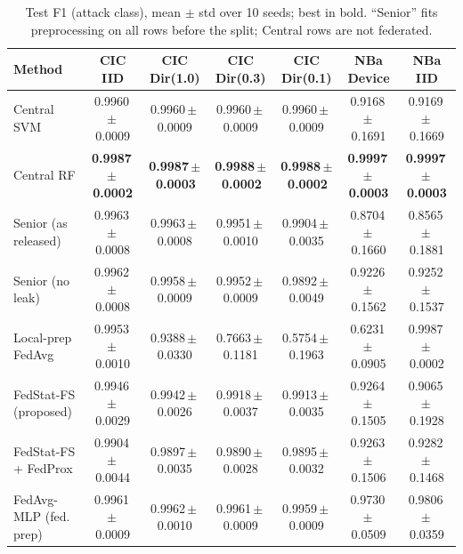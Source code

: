 \begin{table}[t]
\centering
\caption{Test F1 (attack class), mean $\pm$ std over 10 seeds; best in bold. ``Senior'' fits preprocessing on all rows before the split; Central rows are not federated.}
\label{tab:main}
\tiny
\setlength{\tabcolsep}{2.4pt}
\begin{tabular}{lcccccc}
\toprule
Method & CIC IID & CIC Dir(1.0) & CIC Dir(0.3) & CIC Dir(0.1) & NBa Device & NBa IID \\
\midrule
Central SVM & 0.9960\,$\pm$\,0.0009 & 0.9960\,$\pm$\,0.0009 & 0.9960\,$\pm$\,0.0009 & 0.9960\,$\pm$\,0.0009 & 0.9168\,$\pm$\,0.1691 & 0.9169\,$\pm$\,0.1669 \\
Central RF & \textbf{0.9987\,$\pm$\,0.0002} & \textbf{0.9987\,$\pm$\,0.0003} & \textbf{0.9988\,$\pm$\,0.0002} & \textbf{0.9988\,$\pm$\,0.0002} & \textbf{0.9997\,$\pm$\,0.0003} & \textbf{0.9997\,$\pm$\,0.0003} \\
Senior (as released) & 0.9963\,$\pm$\,0.0008 & 0.9963\,$\pm$\,0.0008 & 0.9951\,$\pm$\,0.0010 & 0.9904\,$\pm$\,0.0035 & 0.8704\,$\pm$\,0.1660 & 0.8565\,$\pm$\,0.1881 \\
Senior (no leak) & 0.9962\,$\pm$\,0.0008 & 0.9958\,$\pm$\,0.0009 & 0.9952\,$\pm$\,0.0009 & 0.9892\,$\pm$\,0.0049 & 0.9226\,$\pm$\,0.1562 & 0.9252\,$\pm$\,0.1537 \\
Local-prep FedAvg & 0.9953\,$\pm$\,0.0010 & 0.9388\,$\pm$\,0.0330 & 0.7663\,$\pm$\,0.1181 & 0.5754\,$\pm$\,0.1963 & 0.6231\,$\pm$\,0.0905 & 0.9987\,$\pm$\,0.0002 \\
FedStat-FS (proposed) & 0.9946\,$\pm$\,0.0029 & 0.9942\,$\pm$\,0.0026 & 0.9918\,$\pm$\,0.0037 & 0.9913\,$\pm$\,0.0035 & 0.9264\,$\pm$\,0.1505 & 0.9065\,$\pm$\,0.1928 \\
FedStat-FS + FedProx & 0.9904\,$\pm$\,0.0044 & 0.9897\,$\pm$\,0.0035 & 0.9890\,$\pm$\,0.0028 & 0.9895\,$\pm$\,0.0032 & 0.9263\,$\pm$\,0.1506 & 0.9282\,$\pm$\,0.1468 \\
FedAvg-MLP (fed. prep) & 0.9961\,$\pm$\,0.0009 & 0.9962\,$\pm$\,0.0010 & 0.9961\,$\pm$\,0.0009 & 0.9959\,$\pm$\,0.0009 & 0.9730\,$\pm$\,0.0509 & 0.9806\,$\pm$\,0.0359 \\
\bottomrule
\end{tabular}
\end{table}